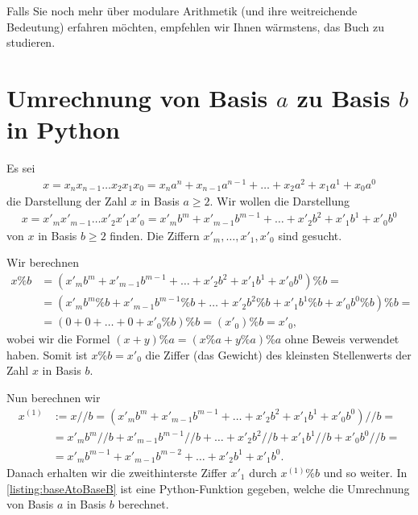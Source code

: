 Falls Sie noch mehr über modulare Arithmetik (und ihre weitreichende Bedeutung) erfahren möchten, empfehlen wir Ihnen wärmstens, das Buch \cite{LearningModernAlgebra} zu studieren.


\section{Umrechnung von Basis \texorpdfstring{$a$}{a} zu Basis \texorpdfstring{$b$}{b} in Python}
Es sei
\begin{align*}
	x = x_nx_{n-1}\ldots x_2x_1x_0 = x_na^n + x_{n-1}a^{n-1} + \ldots + x_2a^2 + x_1a^1 + x_0a^0
\end{align*}
die Darstellung der Zahl $x$ in Basis $a\geq 2$. Wir wollen die Darstellung
\begin{align*}
	x = x'_mx'_{m-1}\ldots x'_2x'_1x'_0 = x'_mb^m + x'_{m-1}b^{m-1} + \ldots + x'_2b^2 + x'_1b^1 + x'_0b^0
\end{align*}
von $x$ in Basis $b\geq 2$ finden. Die  Ziffern $x'_m, \ldots, x'_1, x'_0$ sind gesucht.

Wir berechnen
\begin{align*}
	x\% b & = (x'_mb^m + x'_{m-1}b^{m-1} + \ldots + x'_2b^2 + x'_1b^1 + x'_0b^0) \% b =                          \\
	      & = (x'_mb^m \% b + x'_{m-1}b^{m-1} \% b + \ldots + x'_2b^2 \% b + x'_1b^1 \% b + x'_0b^0 \% b) \% b = \\
	      & = (0 + 0 + \ldots + 0 + x'_0\%b)\% b = (x'_0)\% b = x'_0,
\end{align*}
wobei wir die Formel $(x + y) \% a = (x\% a + y\% a)\% a$ ohne Beweis verwendet haben. Somit ist $x\% b = x'_0$ die Ziffer (das Gewicht) des kleinsten Stellenwerts der Zahl $x$ in Basis $b$.

Nun berechnen wir
\begin{align*}
	x^{(1)} & := x // b =  (x'_mb^m + x'_{m-1}b^{m-1} + \ldots + x'_2b^2 + x'_1b^1 + x'_0b^0) // b =     \\
	        & = x'_mb^m // b + x'_{m-1}b^{m-1} // b+ \ldots + x'_2b^2 // b+ x'_1b^1 // b+ x'_0b^0 // b = \\
	        & = x'_mb^{m-1} + x'_{m-1}b^{m-2} + \ldots + x'_2b^1 + x'_1b^0.
\end{align*}
Danach erhalten wir die zweithinterste Ziffer $x'_1$ durch $x^{(1)}\% b$ und so weiter. In \cref{listing:baseAtoBaseB} ist eine Python-Funktion gegeben, welche die Umrechnung von Basis $a$ in Basis $b$ berechnet.

\clearpage

